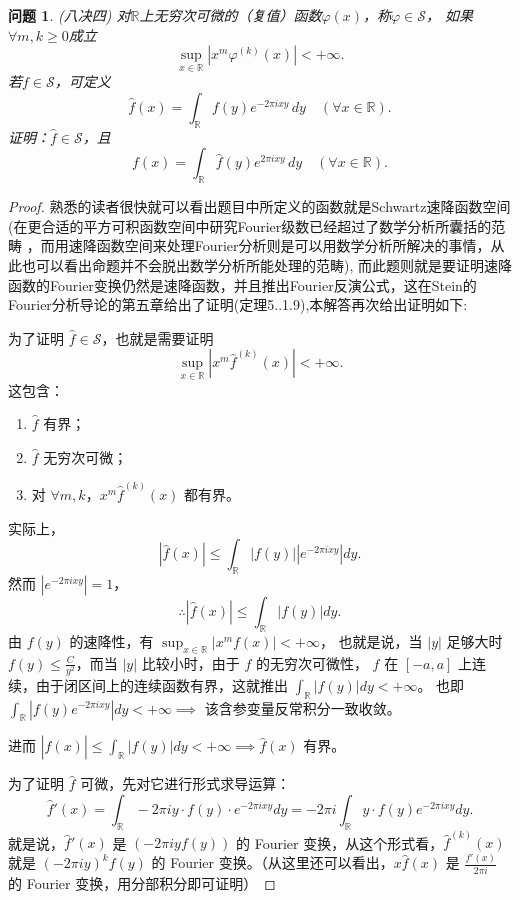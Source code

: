 \documentclass[12pt]{ctexart}  %
\newtheorem{question}{问题}[]
\begin{document}
\begin{question}(八决四)
    对$\mathbb{R}$上无穷次可微的（复值）函数$\varphi(x)$，称$\varphi \in \mathcal{S}$，
如果$\forall m,k \ge 0$成立
\[
\sup_{x\in\mathbb{R}} \left| x^m \varphi^{(k)}(x) \right| < +\infty.
\]
若$f \in \mathcal{S}$，可定义
\[
\hat{f}(x) = \int_{\mathbb{R}} f(y) e^{-2\pi i x y} \, dy\quad (\forall x \in \mathbb{R}).
\]
证明：$\hat{f} \in \mathcal{S}$，且
\[
f(x) = \int_{\mathbb{R}} \hat{f}(y) e^{2\pi i x y} \, dy\quad (\forall x \in \mathbb{R}).
\]
\end{question}
\begin{proof}
    熟悉的读者很快就可以看出题目中所定义的函数就是Schwartz速降函数空间(在更合适的平方可积函数空间中研究Fourier级数已经超过了数学分析所囊括的范畴
    ，而用速降函数空间来处理Fourier分析则是可以用数学分析所解决的事情，从此也可以看出命题并不会脱出数学分析所能处理的范畴),
    而此题则就是要证明速降函数的Fourier变换仍然是速降函数，并且推出Fourier反演公式，这在Stein的Fourier分析导论的第五章给出了证明(定理5..1.9),本解答再次给出证明如下:

    为了证明 \(\hat{f} \in \mathcal{S}\)，也就是需要证明
\[
\sup_{x\in\mathbb{R}} \left| x^m \hat{f}^{(k)}(x) \right| < +\infty.
\]
这包含：
\begin{enumerate}
    \item \(\hat{f}\) 有界；
    \item \(\hat{f}\) 无穷次可微；
    \item 对 \(\forall m,k\)，\(x^m \hat{f}^{(k)}(x)\) 都有界。
\end{enumerate}

\vspace{0.5em}
实际上，
\[
|\hat{f}(x)| \le \int_{\mathbb{R}} |f(y)| |e^{-2\pi i x y}| dy.
\]
然而 \(|e^{-2\pi i x y}| = 1\)，
\[
\therefore |\hat{f}(x)| \le \int_{\mathbb{R}} |f(y)| dy.
\]
由 \(f(y)\) 的速降性，有 \(\sup_{x\in\mathbb{R}} |x^m f(x)| < +\infty\)，
也就是说，当 \(|y|\) 足够大时 \(f(y) \le \frac{C}{y^2}\)，而当 \(|y|\) 比较小时，由于 \(f\) 的无穷次可微性，
\(f\) 在 \([-a,a]\) 上连续，由于闭区间上的连续函数有界，这就推出 \(\int_{\mathbb{R}} |f(y)| dy < +\infty\)。
也即 \(\int_{\mathbb{R}} |f(y) e^{-2\pi i x y}| dy < +\infty \implies\) 该含参变量反常积分一致收敛。

\vspace{0.5em}
进而 \(|\hat{f}(x)| \le \int_{\mathbb{R}} |f(y)| dy < +\infty \implies \hat{f}(x)\) 有界。

\vspace{0.5em}
为了证明 \(\hat{f}\) 可微，先对它进行形式求导运算：
\[
\hat{f}'(x) = \int_{\mathbb{R}} -2\pi i y \cdot f(y) \cdot e^{-2\pi i x y} dy
= -2\pi i \int_{\mathbb{R}} y \cdot f(y) e^{-2\pi i x y} dy.
\]
就是说，\(\hat{f}'(x)\) 是 \((-2\pi i y f(y))\) 的 Fourier 变换，从这个形式看，\(\hat{f}^{(k)}(x)\) 就是 \((-2\pi i y)^k f(y)\) 的 Fourier
变换。（从这里还可以看出，\(x\hat{f}(x)\) 是 \(\frac{f'(x)}{2\pi i}\) 的 Fourier 变换，用分部积分即可证明）


\end{proof}
\end{document}
